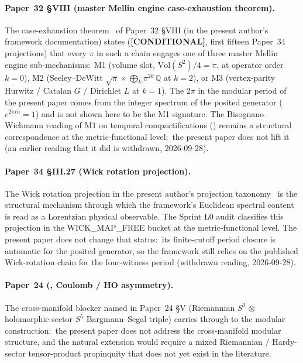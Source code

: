 \documentclass[11pt,a4paper]{article}
\theoremstyle{plain}
\theoremstyle{definition}
\newcommand{\sthree}{S^{3}}
\newcommand{\Q}{\mathbb{Q}}
\newcommand{\Vol}{\mathrm{Vol}}
\begin{document}
\paragraph{Paper~32 \S VIII (master Mellin engine case-exhaustion
theorem).}
The case-exhaustion theorem~\cite[Thm.~thm:pi\_source\_case\_exhaustion]{paper32}
of Paper~32 \S VIII (in the present author's framework documentation)
states (\textbf{[CONDITIONAL]}, first fifteen Paper~34 projections)
that every $\pi$ in such a chain engages one of three master Mellin
engine sub-mechanisms:\ M1 (volume slot, $\Vol(S^2)/4 = \pi$, at
operator order $k = 0$), M2 (Seeley--DeWitt
$\sqrt{\pi}\times\bigoplus_k \pi^{2k}\,\Q$ at $k = 2$), or M3 (vertex-parity Hurwitz / Catalan
$G$ / Dirichlet $L$ at $k = 1$). The $2\pi$ in the modular period of
the present paper comes from the integer spectrum of the posited
generator ($e^{2\pi i n} = 1$) and is not shown here to be the M1
signature.  The Bisognano--Wichmann reading of M1 on temporal
compactifications (\cite[Rem.~rem:bisognano\_wichmann\_reading]{paper32})
remains a structural correspondence at the metric-functional level;\
the present paper does not lift it (an earlier reading that it did is
withdrawn, 2026-09-28).

\paragraph{Paper~34 \S III.27 (Wick rotation projection).}
The Wick rotation projection in the present author's projection
taxonomy~\cite{paper34} is the structural mechanism through which the
framework's Euclidean spectral content is read as a Lorentzian
physical observable. The Sprint L0 audit classifies this
projection in the WICK\_MAP\_FREE bucket at the metric-functional
level. The present paper does not change that status:\ its
finite-cutoff period closure is automatic for the posited generator,
so the framework still relies on the published Wick-rotation chain for
the four-witness period (withdrawn reading, 2026-09-28).

\paragraph{Paper~24 (\cite{paper24}, Coulomb / HO asymmetry).}
The cross-manifold blocker named in Paper~24 \S V (Riemannian $\sthree$
$\otimes$ holomorphic-sector $S^5$ Bargmann--Segal triple) carries
through to the modular construction:\ the present paper does not
address the cross-manifold modular structure, and the natural
extension would require a mixed Riemannian / Hardy-sector
tensor-product propinquity that does not yet exist in the literature.
\end{document}
